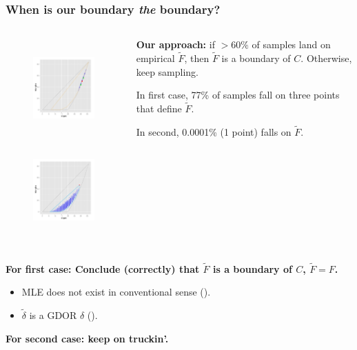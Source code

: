 \documentclass[ 10pt]{beamer}
\begin{document}
\frame
{
\frametitle{When is our boundary \emph{the} boundary?}  
\begin{columns}[]
\begin{column}[T]{0.4\textwidth}
\begin{figure}[h]
\centering
\includegraphics[height=1.5in, trim=3.5in 2in 0.in 0.0in, clip = true ]{MCsample-77face}
\includegraphics[height=1.5in, trim=3.in 2in 0.15in 0.05in, clip = true ]{MCsample-interiorptonF}
\end{figure}

\end{column}

\begin{column}[t]{0.6\textwidth}
\pause 

\textbf{Our approach:} if $>60\%$ of samples land on empirical $\tilde{F}$, then $\tilde{F}$ is a boundary of $C$.  Otherwise, keep sampling.
\pause
\vspace{4mm}

In first case, 77\% of samples fall on three points that define $\tilde{F}$.  

In second, 0.0001\% (1 point) falls on $\tilde{F}$.

\end{column}
\end{columns}
\vspace{2mm}
\pause

\textbf{For first case: Conclude (correctly) that $\tilde{F}$ is a boundary of $C$, $\tilde{F} = F$.}
\begin{itemize}
\item MLE does not exist in conventional sense (\alert{\checkmark}).
\item $\tilde{\delta}$ is a GDOR $\delta$ (\alert{\checkmark}).
\end{itemize}
\vspace{2mm}
\pause

\textbf{For second case: keep on truckin'.}
}
\end{document}
